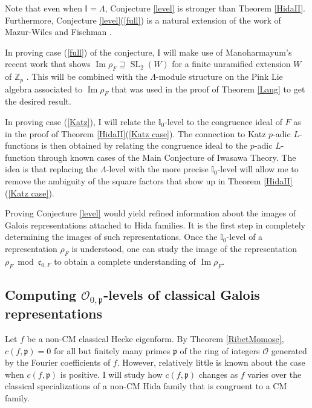\documentclass[11pt]{amsart}
\theoremstyle{definition}
\theoremstyle{remark}
\def\cc{\mathfrak{c}}
\def\I{\mathbb{I}}
\def\OK{\mathcal{O}}
\def\p{\mathfrak{p}}
\def\Z{\mathbb{Z}}
\DeclareMathOperator{\im}{Im}
\DeclareMathOperator{\SL}{SL}
\begin{document}
Note that even when $\I = \Lambda$, Conjecture \ref{level} is stronger than Theorem \ref{HidaII}.  Furthermore, Conjecture \ref{level}(\ref{full}) is a natural extension of the work of  Mazur-Wiles \cite{MazurWiles86} and Fischman \cite{Fischman02}.

In proving case (\ref{full}) of the conjecture, I will make use of Manoharmayum's recent work that shows $\im \rho_F \supseteq \SL_2(W)$ for a finite unramified extension $W$ of $\Z_p$ \cite{Manoharmayum15}.  This will be combined with the $\Lambda$-module structure on the Pink Lie algebra associated to $\im \rho_F$ that was used in the proof of Theorem \ref{Lang} to get the desired result.

In proving case (\ref{Katz}), I will relate the $\I_0$-level to the congruence ideal of $F$ as in the proof of Theorem \ref{HidaII}(\ref{Katz case}).  The connection to Katz $p$-adic $L$-functions is then obtained by relating the congruence ideal to the $p$-adic $L$-function through known cases of the Main Conjecture of Iwasawa Theory.  The idea is that replacing the $\Lambda$-level with the more precise $\I_0$-level will allow me to remove the ambiguity of the square factors that show up in Theorem \ref{HidaII}(\ref{Katz case}).

Proving Conjecture \ref{level} would yield refined information about the images of Galois representations attached to Hida families.  It is the first step in completely determining the images of such representations.  Once the $\I_0$-level of a representation $\rho_F$ is understood, one can study the image of the representation $\rho_F \bmod \cc_{0,F}$ to obtain a complete understanding of $\im \rho_F$.

\subsection*{Computing $\OK_{0, \p}$-levels of classical Galois representations}\label{classical images}
Let $f$ be a non-CM classical Hecke eigenform.  By Theorem \ref{RibetMomose}, $c(f, \p) = 0$ for all but finitely many primes $\p$ of the ring of integers $\OK$ generated by the Fourier coefficients of $f$.  However, relatively little is known about the case when $c(f, \p)$ is positive.  I will study how $c(f, \p)$ changes as $f$ varies over the classical specializations of a non-CM Hida family that is congruent to a CM family.
\end{document}

